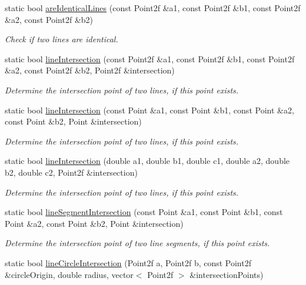 \begin{DoxyCompactItemize}
static bool \hyperlink{classmultiscale_1_1Geometry2D_a718faf02b261c9ccbedf9d7b0e19ada1}{are\-Identical\-Lines} (const \-Point2f \&a1, const \-Point2f \&b1, const \-Point2f \&a2, const \-Point2f \&b2)
\begin{DoxyCompactList}\small\item\em \-Check if two lines are identical. \end{DoxyCompactList}\item 
static bool \hyperlink{classmultiscale_1_1Geometry2D_aae24e97b32bdd8dab88c880d0d25ec86}{line\-Intersection} (const \-Point2f \&a1, const \-Point2f \&b1, const \-Point2f \&a2, const \-Point2f \&b2, \-Point2f \&intersection)
\begin{DoxyCompactList}\small\item\em \-Determine the intersection point of two lines, if this point exists. \end{DoxyCompactList}\item 
static bool \hyperlink{classmultiscale_1_1Geometry2D_aa9d9b17a7e5098c8bde0cd9d3dc08dc2}{line\-Intersection} (const \-Point \&a1, const \-Point \&b1, const \-Point \&a2, const \-Point \&b2, \-Point \&intersection)
\begin{DoxyCompactList}\small\item\em \-Determine the intersection point of two lines, if this point exists. \end{DoxyCompactList}\item 
static bool \hyperlink{classmultiscale_1_1Geometry2D_a51a867b90c8492ce4ce85c227788678b}{line\-Intersection} (double a1, double b1, double c1, double a2, double b2, double c2, \-Point2f \&intersection)
\begin{DoxyCompactList}\small\item\em \-Determine the intersection point of two lines, if this point exists. \end{DoxyCompactList}\item 
static bool \hyperlink{classmultiscale_1_1Geometry2D_a9931c3d8089d658186a8c1ac78db5773}{line\-Segment\-Intersection} (const \-Point \&a1, const \-Point \&b1, const \-Point \&a2, const \-Point \&b2, \-Point \&intersection)
\begin{DoxyCompactList}\small\item\em \-Determine the intersection point of two line segments, if this point exists. \end{DoxyCompactList}\item 
static bool \hyperlink{classmultiscale_1_1Geometry2D_ab04c08f83d066f0d936d516d015ea62c}{line\-Circle\-Intersection} (\-Point2f a, \-Point2f b, const \-Point2f \&circle\-Origin, double radius, vector$<$ \-Point2f $>$ \&intersection\-Points)

\end{DoxyCompactItemize}
